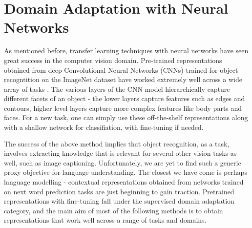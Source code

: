 \documentclass[12pt]{report}
\begin{document}
	\section{Domain Adaptation with Neural Networks}
	As mentioned before, transfer learning techniques with neural networks have seen great success in the computer vision domain. Pre-trained representations obtained from deep Convolutional Neural Networks (CNNs) trained for object recogntition on the ImageNet dataset \citep{deng2009imagenet} have worked extremely well across a wide array of tasks \citep{huh2016makes}. The various layers of the CNN model hierarchically capture different facets of an object - the lower layers capture features such as edges and contours, higher level layers capture more complex features like body parts and faces. For a new task, one can simply use these off-the-shelf representations along with a shallow network for classifiation, with fine-tuning if needed. 
	\par The success of the above method implies that object recognition, as a task, involves extracting knowledge that is relevant for several other vision tasks as well, such as image captioning. Unfortunately, we are yet to find such a generic proxy objective for language understanding. The closest we have come is perhaps language modelling - contextual representations obtained from networks trained on next word prediction tasks are just beginning to gain traction. Pretrained representations with fine-tuning fall under the supervised domain adaptation category, and the main aim of most of the following methods is to obtain representations that work well across a range of tasks and domains.
	
\end{document}
